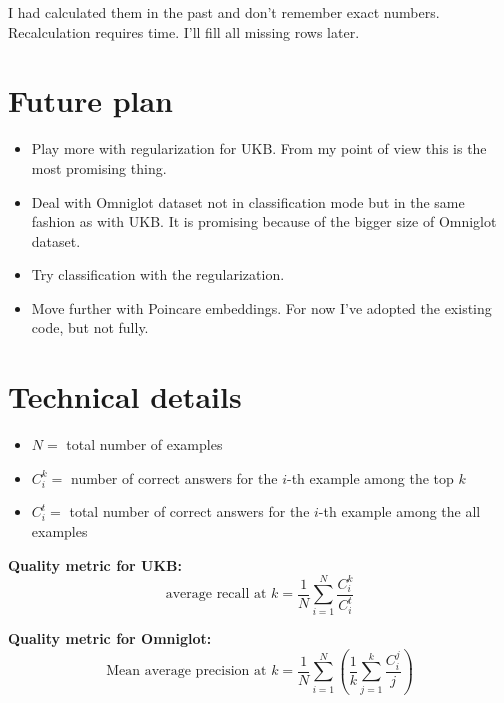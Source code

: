 \documentclass[a4paper,12pt]{extreport}
\begin{document}
    I had calculated them in the past and don't remember exact numbers. Recalculation requires time.
    I'll fill all missing rows later.
    \newline

    \chapter{Future plan}\label{ch:futurePlan}

    \begin{itemize}
        \item {Play more with regularization for UKB. From my point of view this is the most promising thing.}
        \item {Deal with Omniglot dataset not in classification mode but in the same fashion as with UKB. It is promising because of the bigger size
        of Omniglot dataset.}
        \item {Try classification with the regularization.}
        \item {Move further with Poincare embeddings. For now I've adopted the existing code, but not fully.}
    \end{itemize}



    \chapter{Technical details}\label{ch:technicalDetails}

    \begin{itemize}
        \item{$N = $ total number of examples}
        \item{$C_i^k = $ number of correct answers for the $i$-th example among the top $k$}
        \item{$C_i^t = $ total number of correct answers for the $i$-th example among the all examples}
    \end{itemize}

    \textbf{Quality metric for UKB:}
    \[\text{average recall at $k$} = \frac{1}{N}\sum_{i = 1}^{N}
    \frac{C_i^k}{C_i^t}\]

    \textbf{Quality metric for Omniglot:}
    \[\text{Mean average precision at $k$} = \frac{1}{N}\sum_{i = 1}^{N}
    \left( \frac{1}{k}\sum_{j = 1}^{k} \frac{C_i^j}{j} \right) \]
\end{document}
